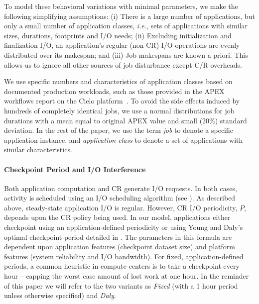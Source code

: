 \documentclass[conference,nofonttune]{IEEEtran}
\newcommand{\ie}[0]{\emph{i.e.}\xspace}
\begin{document}
To model these behavioral variations with minimal parameters, we make the following
simplifying assumptions: (i) There is a large number of applications, but only a small number of application
  classes, \ie, sets of applications with similar sizes, durations, footprints and
  I/O needs; (ii) Excluding initialization and finalization I/O, an application's regular
  (non-CR) I/O operations are evenly distributed over its makespan; and (iii) Job makespans are known a priori. This allows us to ignore all other
  sources of job disturbance except C/R overheads.

We use specific numbers and characteristics of application classes based on
documented production workloads, such as those provided in the APEX workflows report
on the Cielo platform~\cite{apex2016}.  To avoid the side effects induced by
hundreds of completely identical jobs, we use a normal distributions for job
durations with a mean equal to original APEX value and small (20\%) standard
deviation.  In the rest of the paper, we use the term \emph{job} to denote
a specific application instance, and \emph{application class} to denote a set
of applications with similar characteristics.

\paragraph*{Checkpoint Period and I/O Interference}

Both application computation and CR generate I/O requests.  In both cases, activity
is scheduled using an I/O scheduling algorithm (see ). As
described above, steady-state application I/O is regular. However, CR I/O
periodicity, $P$, depends upon the CR policy being used.  In our model, applications
either checkpoint using an application-defined periodicity or using Young and
Daly's~\cite{young74,daly04} optimal checkpoint period detailed in
. The parameters in this formula are dependent
upon application features (checkpoint dataset size) and platform features (system
reliability and I/O bandwidth).  For fixed, application-defined periods, a common
heuristic in compute centers is to take a checkpoint every hour -- capping the worst case amount of lost
work at one hour.  In the reminder of this paper we will refer to the two variants as
\emph{Fixed} (with a 1 hour period unless otherwise specified) and \emph{Daly}.
\end{document}
